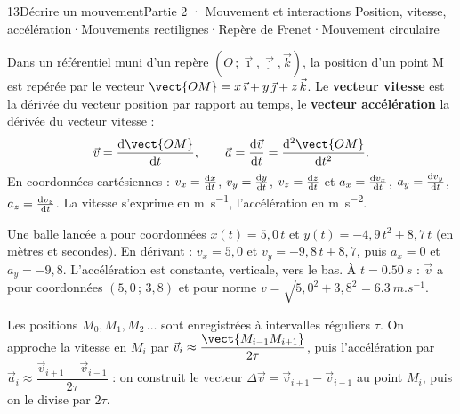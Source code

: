 \begin{ouverture}[mouvement]{13}{Décrire un mouvement}{Partie 2 · Mouvement et interactions}
{Position, vitesse, accélération\enspace·\enspace Mouvements rectilignes\enspace·\enspace Repère de Frenet\enspace·\enspace Mouvement circulaire}
\end{ouverture}
\essentiel
{}
\begin{definition}
Dans un référentiel muni d'un repère $(O\,;\vec{\imath},\vec{\jmath},\vec{k})$, la position d'un point M est repérée par le
vecteur $\vect{OM}=x\,\vec{\imath}+y\,\vec{\jmath}+z\,\vec{k}$. Le \textbf{vecteur vitesse} est la dérivée du vecteur position
par rapport au temps, le \textbf{vecteur accélération} la dérivée du vecteur vitesse :
\[\vec{v}=\ddt{\vect{OM}},\qquad \vec{a}=\ddt{\vec{v}}=\frac{\mathrm{d}^2\vect{OM}}{\mathrm{d}t^2}.\]
En coordonnées cartésiennes : $v_x=\frac{\mathrm{d}x}{\mathrm{d}t}$, $v_y=\frac{\mathrm{d}y}{\mathrm{d}t}$, $v_z=\frac{\mathrm{d}z}{\mathrm{d}t}$ et $a_x=\frac{\mathrm{d}v_x}{\mathrm{d}t}$, $a_y=\frac{\mathrm{d}v_y}{\mathrm{d}t}$, $a_z=\frac{\mathrm{d}v_z}{\mathrm{d}t}$. La
vitesse s'exprime en \unit{m.s^{-1}}, l'accélération en \unit{m.s^{-2}}.
\end{definition}
\begin{exemple}
Une balle lancée a pour coordonnées $x(t)=5{,}0\,t$ et $y(t)=-4{,}9\,t^2+8{,}7\,t$ (en mètres et secondes). En dérivant :
$v_x=5{,}0$ et $v_y=-9{,}8\,t+8{,}7$, puis $a_x=0$ et $a_y=-9{,}8$. L'accélération est constante, verticale, vers le bas.
À $t=\qty{0,50}{s}$ : $\vec{v}$ a pour coordonnées $(5{,}0\,;\,3{,}8)$ et pour norme
$v=\sqrt{5{,}0^2+3{,}8^2}=\qty{6,3}{m.s^{-1}}$.
\end{exemple}
\begin{savoirfaire}
Les positions $M_0, M_1, M_2\,\dots$ sont enregistrées à intervalles réguliers $\tau$. On approche la vitesse en $M_i$ par
$\vec{v}_i\approx\dfrac{\vect{M_{i-1}M_{i+1}}}{2\tau}$, puis l'accélération par
$\vec{a}_i\approx\dfrac{\vec{v}_{i+1}-\vec{v}_{i-1}}{2\tau}$ : on construit le vecteur $\Delta\vec{v}=\vec{v}_{i+1}-\vec{v}_{i-1}$
au point $M_i$, puis on le divise par $2\tau$.
\end{savoirfaire}
